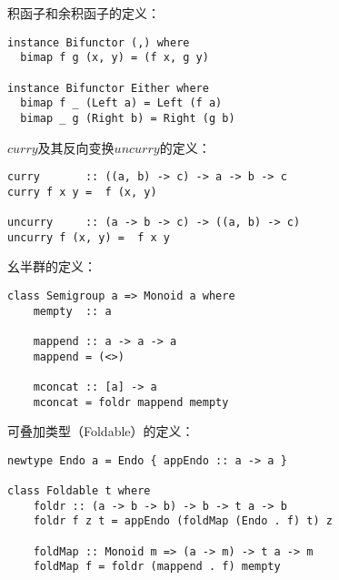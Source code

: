 \documentclass{article}
\begin{document}
积函子和余积函子的定义：

\begin{lstlisting}
instance Bifunctor (,) where
  bimap f g (x, y) = (f x, g y)

instance Bifunctor Either where
  bimap f _ (Left a) = Left (f a)
  bimap _ g (Right b) = Right (g b)
\end{lstlisting}

$curry$及其反向变换$uncurry$的定义：

\begin{lstlisting}
curry       :: ((a, b) -> c) -> a -> b -> c
curry f x y =  f (x, y)

uncurry     :: (a -> b -> c) -> ((a, b) -> c)
uncurry f (x, y) =  f x y
\end{lstlisting}

幺半群的定义：

\begin{lstlisting}
class Semigroup a => Monoid a where
    mempty  :: a

    mappend :: a -> a -> a
    mappend = (<>)

    mconcat :: [a] -> a
    mconcat = foldr mappend mempty
\end{lstlisting}

可叠加类型（Foldable）的定义：

\begin{lstlisting}
newtype Endo a = Endo { appEndo :: a -> a }

class Foldable t where
    foldr :: (a -> b -> b) -> b -> t a -> b
    foldr f z t = appEndo (foldMap (Endo . f) t) z

    foldMap :: Monoid m => (a -> m) -> t a -> m
    foldMap f = foldr (mappend . f) mempty
\end{lstlisting}
\end{document}
